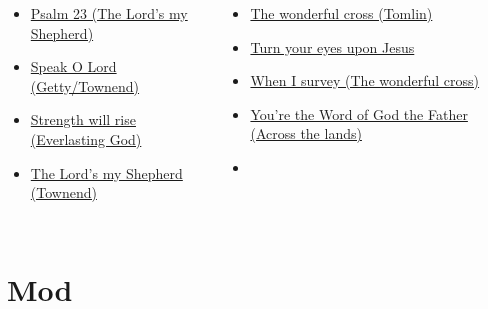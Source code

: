 \documentclass{beamer}
\begin{document}
            \begin{frame}[t]
            \begin{columns}[t]
        \begin{itemize}
    \item \hyperlink{The Lord's my Shepherd['Psalm 23'](Townend)}{Psalm 23 (The Lord's my Shepherd)} \phantom{ 1}
    \item \hyperlink{Speak O Lord[](Getty/Townend)}{Speak O Lord (Getty/Townend)} \phantom{ 1 1 1 1}
                    \item \hyperlink{Everlasting God['Strength will rise']}{Strength will rise (Everlasting God)} \phantom{}
            \item \hyperlink{The Lord's my Shepherd['Psalm 23'](Townend)}{The Lord's my Shepherd (Townend)} \phantom{ 1 1}
\end{itemize}
        \begin{itemize}
                    \item \hyperlink{The wonderful cross['When I survey'](Tomlin)}{The wonderful cross (Tomlin)} \phantom{ 1 1 1 1}
    \item \hyperlink{Turn your eyes upon Jesus[]}{Turn your eyes upon Jesus } \phantom{ 1 1 1 1 1}
    \item \hyperlink{The wonderful cross['When I survey'](Tomlin)}{When I survey (The wonderful cross)} \phantom{}
            \item \hyperlink{Across the lands["You're the Word of God the Father"](Townend)}{You're the Word of God the Father (Across the lands)} \phantom{}
    \item[] \phantom{1}\end{itemize}


\end{columns}

\end{frame}
\section{Mod}
\end{document}
